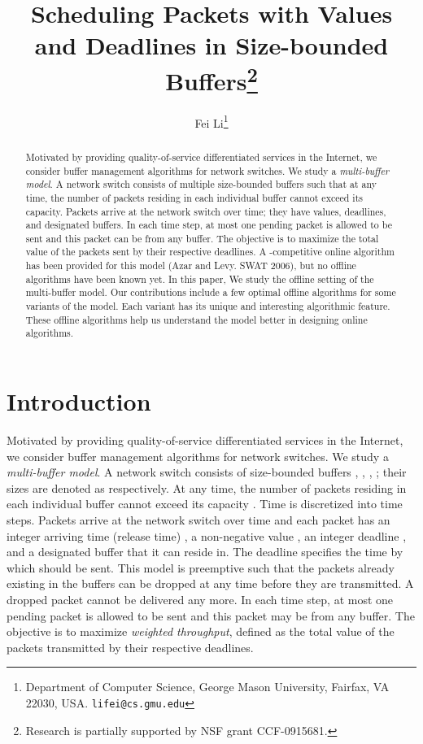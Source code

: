 \documentclass[final, 11pt]{article}
\begin{document}
\title{Scheduling Packets with Values and Deadlines in Size-bounded Buffers\thanks{Research is partially supported by NSF grant CCF-0915681.}}

\author{Fei Li\thanks{Department of Computer Science, George Mason University, Fairfax, VA 22030, USA. {\tt lifei@cs.gmu.edu}}}

\maketitle


\begin{abstract}
Motivated by providing quality-of-service differentiated services in the Internet, we consider buffer management algorithms for network switches. We study a {\em multi-buffer model}. A network switch consists of multiple size-bounded buffers such that at any time, the number of packets residing in each individual buffer cannot exceed its capacity. Packets arrive at the network switch over time; they have values, deadlines, and designated buffers. In each time step, at most one pending packet is allowed to be sent and this packet can be from any buffer. The objective is to maximize the total value of the packets sent by their respective deadlines. A -competitive online algorithm has been provided for this model (Azar and Levy. SWAT 2006), but no offline algorithms have been known yet. In this paper, We study the offline setting of the multi-buffer model. Our contributions include a few optimal offline algorithms for some variants of the model. Each variant has its unique and interesting algorithmic feature. These offline algorithms help us understand the model better in designing online algorithms.
\end{abstract}

\newpage


\section{Introduction}

Motivated by providing quality-of-service differentiated services in the Internet, we consider buffer management algorithms for network switches. We study a {\em multi-buffer model}. A network switch consists of  size-bounded buffers , , , ; their sizes are denoted as  respectively. At any time, the number of packets residing in each individual buffer  cannot exceed its capacity . Time is discretized into time steps. Packets arrive at the network switch over time and each packet  has an integer arriving time (release time) , a non-negative value , an integer deadline , and a designated buffer  that it can reside in. The deadline  specifies the time by which  should be sent. This model is preemptive such that the packets already existing in the buffers can be dropped at any time before they are transmitted. A dropped packet cannot be delivered any more. In each time step, at most one pending packet is allowed to be sent and this packet may be from any buffer. The objective is to maximize {\em weighted throughput}, defined as the total value of the packets transmitted by their respective deadlines.
\end{document}
